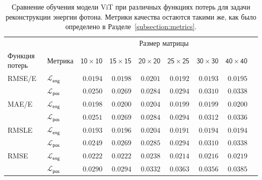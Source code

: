 \documentclass[a4paper,12pt]{extarticle}
\begin{document}
\begin{table}[t]
	\footnotesize
	\centering
	\begin{tabular}{llrrrrrrr}
		\toprule
		{} & {} & \multicolumn{6}{c}{\textsf{Размер матрицы}} \\
		\cmidrule(lr){3-8}
		\textsf{Функция потерь} & \textsf{Метрика} & $\mathsf{10 \times 10}$ &  $\mathsf{15 \times 15}$ &  $\mathsf{20 \times 20}$ &  $\mathsf{25 \times 25}$ &  $\mathsf{30 \times 30}$ &  $\mathsf{40 \times 40}$ \\
		\midrule
        \textsf{RMSE/E} & $\mathcal{L}_{\mathsf{eng}}$ & $\mathsf{0.0194}$ & $\mathsf{0.0198}$ & $\mathsf{0.0201}$ & $\mathsf{0.0192}$ & $\mathsf{0.0193}$ & $\mathsf{0.0195}$ \\
        {} & $\mathcal{L}_{\mathsf{pos}}$ & $\mathsf{0.0250}$ & $\mathsf{0.0269}$ & $\mathsf{0.0284}$ & $\mathsf{0.0294}$ & $\mathsf{0.0310}$ & $\mathsf{0.0338}$ \\
        \midrule
        \textsf{MAE/E} & $\mathcal{L}_{\mathsf{eng}}$ & $\mathsf{0.0198}$ & $\mathsf{0.0200}$ & $\mathsf{0.0204}$ & $\mathsf{0.0199}$ & $\mathsf{0.0199}$ & $\mathsf{0.0200}$ \\
        {} & $\mathcal{L}_{\mathsf{pos}}$ & $\mathsf{0.0251}$ & $\mathsf{0.0269}$ & $\mathsf{0.0284}$ & $\mathsf{0.0294}$ & $\mathsf{0.0312}$ & $\mathsf{0.0336}$ \\
        \midrule
        \textsf{RMSLE} & $\mathcal{L}_{\mathsf{eng}}$ & $\mathsf{0.0193}$ & $\mathsf{0.0196}$ & $\mathsf{0.0204}$ & $\mathsf{0.0191}$ & $\mathsf{0.0194}$ & $\mathsf{0.0194}$ \\
        {} & $\mathcal{L}_{\mathsf{pos}}$ & $\mathsf{0.0249}$ & $\mathsf{0.0269}$ & $\mathsf{0.0285}$ & $\mathsf{0.0294}$ & $\mathsf{0.0310}$ & $\mathsf{0.0338}$ \\
        \midrule
        \textsf{RMSE} & $\mathcal{L}_{\mathsf{eng}}$ & $\mathsf{0.0222}$ & $\mathsf{0.0222}$ & $\mathsf{0.0238}$ & $\mathsf{0.0214}$ & $\mathsf{0.0216}$ & $\mathsf{0.0219}$ \\
        {} & $\mathcal{L}_{\mathsf{pos}}$ & $\mathsf{0.0290}$ & $\mathsf{0.0294}$ & $\mathsf{0.0332}$ & $\mathsf{0.0363}$ & $\mathsf{0.0356}$ & $\mathsf{0.0385}$ \\
		\bottomrule
	\end{tabular}
    \caption{Сравнение обучения модели \textsf{ViT} при различных функциях потерь для задачи реконструкции энергии фотона. Метрики качества остаются такими же, как было определено в Разделе~\ref{subsection:metrics}.}
	\label{table:loss_comp}
\end{table}
\end{document}
